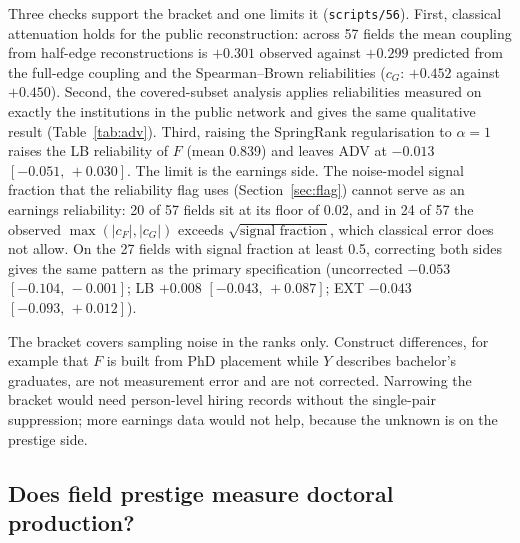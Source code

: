 \documentclass[11pt]{article}
\newcommand{\ci}[2]{$[#1,\allowbreak\,#2]$}
\newcommand{\scr}[1]{\texttt{scripts/#1}}
\begin{document}
Three checks support the bracket and one limits it (\scr{56}).
First, classical attenuation holds for the public reconstruction: across 57 fields the mean coupling from
half-edge reconstructions is $+0.301$ observed against $+0.299$ predicted from the full-edge coupling and the
Spearman--Brown reliabilities ($c_G$: $+0.452$ against $+0.450$).
Second, the covered-subset analysis applies reliabilities measured on exactly the institutions in the public
network and gives the same qualitative result (Table~\ref{tab:adv}).
Third, raising the SpringRank regularisation to $\alpha=1$ raises the LB reliability of $F$ (mean 0.839) and
leaves ADV at $-0.013$ \ci{-0.051}{+0.030}.
The limit is the earnings side. The noise-model signal fraction that the reliability flag uses
(Section~\ref{sec:flag}) cannot serve as an earnings reliability: 20 of 57 fields sit at its floor of 0.02, and
in 24 of 57 the observed $\max(|c_F|,|c_G|)$ exceeds $\sqrt{\text{signal fraction}}$, which classical error
does not allow. On the 27 fields with signal fraction at least 0.5, correcting both sides gives the same
pattern as the primary specification (uncorrected $-0.053$ \ci{-0.104}{-0.001}; LB $+0.008$ \ci{-0.043}{+0.087};
EXT $-0.043$ \ci{-0.093}{+0.012}).

The bracket covers sampling noise in the ranks only. Construct differences, for example that $F$ is built from
PhD placement while $Y$ describes bachelor's graduates, are not measurement error and are not corrected.
Narrowing the bracket would need person-level hiring records without the single-pair suppression; more earnings
data would not help, because the unknown is on the prestige side.

\subsection{Does field prestige measure doctoral production?}\label{sec:production}
\end{document}
